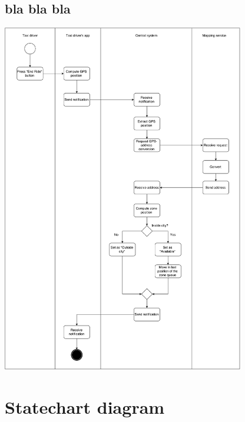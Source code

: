 \subsection{bla bla bla}
\includegraphics[width=300pt,keepaspectratio]{pdfs/04_end_ride.pdf}


\section{Statechart diagram}
\begin{landscape}
%
\end{landscape}

